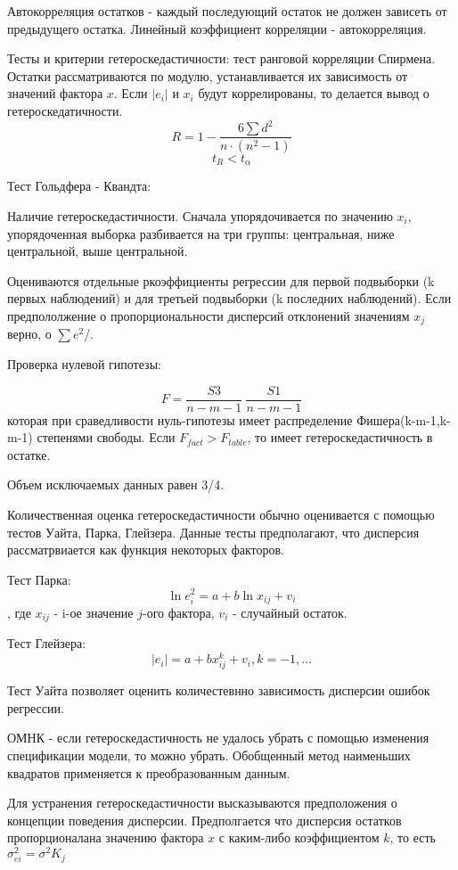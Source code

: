 \documentclass[aps,%
12pt,%
final,%
oneside,
onecolumn,%
musixtex, %
superscriptaddress,%
centertags]{article} %
\begin{document}
Автокорреляция остатков - каждый последующий остаток не должен зависеть от предыдущего остатка. Линейный коэффициент корреляции - автокорреляция.

Тесты и критерии гетероскедастичности: тест ранговой корреляции Спирмена. Остатки рассматриваются по модулю, устанавливается их зависимость от значений фактора $x$. Если $|e_i|$ и $x_i$ будут коррелированы, то делается вывод о гетероскедатичности.
$$ R = 1 - \frac{6\sum d^2}{n \cdot (n^2 - 1)}$$
$$t_R < t_{\alpha}$$

Тест Гольдфера - Квандта:

Наличие гетероскедастичности. Сначала упорядочивается по значению $x_i$, упорядоченная выборка разбивается на три группы: центральная, ниже центральной, выше центральной.

Оцениваются отдельные ркоэффициенты регрессии для первой подвыборки (k первых наблюдений) и для третьей подвыборки (k последних наблюдений). Если предпололжение о пропорциональности дисперсий отклонений значениям $x_j $ верно, о $\sum e^2$/.

Проверка нулевой гипотезы:

$$ F = \frac{S3}{n-m-1} \ \frac{S1}{n-m-1}$$
которая при сраведливости нуль-гипотезы имеет распределение Фишера(k-m-1,k-m-1) степенями свободы.
Если $F_{fact} >F_{table}$, то имеет гетероскедастичность в остатке.

Объем исключаемых данных равен 3/4.

Количественная оценка гетероскедастичности обычно оценивается с помощью тестов Уайта, Парка, Глейзера.
Данные тесты предполагают, что дисперсия рассматрвиается как функция некоторых факторов.

Тест Парка:
$$\ln e_i^2 = a +b\ln x_{ij}+v_i$$, где $x_{ij}$ - i-ое значение $j$-ого фактора, $v_i$ - случайный остаток.

Тест Глейзера:
$$ |e_i| = a + bx_{ij}^k + v_i, k = -1, \ldots$$

Тест Уайта позволяет оценить количестевнно зависимость дисперсии ошибок регрессии.

ОМНК - если гетероскедастичность не удалось убрать с помощью изменения спецификации модели, то можно убрать. Обобщенный метод наименьших квадратов применяется к преобразованным данным.

Для устранения гетероскедастичности высказываются предположения о концепции поведения дисперсии. Предполгается что дисперсия остатков пропорционалана значению фактора $x$ с каким-либо коэффициентом $k$, то есть $\sigma_{ei}^2 = \sigma^2K_j$
\end{document}
